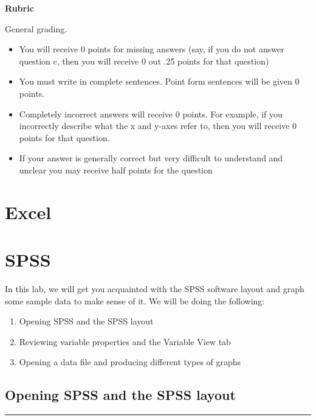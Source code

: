 \documentclass[]{book}
\providecommand{\tightlist}{%
  \setlength{\itemsep}{0pt}\setlength{\parskip}{0pt}}
\begin{document}
\textbf{Rubric}

General grading.

\begin{itemize}
\tightlist
\item
  You will receive 0 points for missing answers (say, if you do not
  answer question c, then you will receive 0 out .25 points for that
  question)
\item
  You must write in complete sentences. Point form sentences will be
  given 0 points.
\item
  Completely incorrect answers will receive 0 points. For example, if
  you incorrectly describe what the x and y-axes refer to, then you will
  receive 0 points for that question.
\item
  If your answer is generally correct but very difficult to understand
  and unclear you may receive half points for the question
\end{itemize}

\section{Excel}\label{excel-1}

\section{SPSS}\label{spss-1}

In this lab, we will get you acquainted with the SPSS software layout
and graph some sample data to make sense of it. We will be doing the
following:

\begin{enumerate}
\def\labelenumi{\arabic{enumi}.}
\tightlist
\item
  Opening SPSS and the SPSS layout
\item
  Reviewing variable properties and the Variable View tab
\item
  Opening a data file and producing different types of graphs
\end{enumerate}

\subsection{Opening SPSS and the SPSS
layout}\label{opening-spss-and-the-spss-layout}

\begin{center}\rule{0.5\linewidth}{0.5pt}\end{center}
\end{document}
